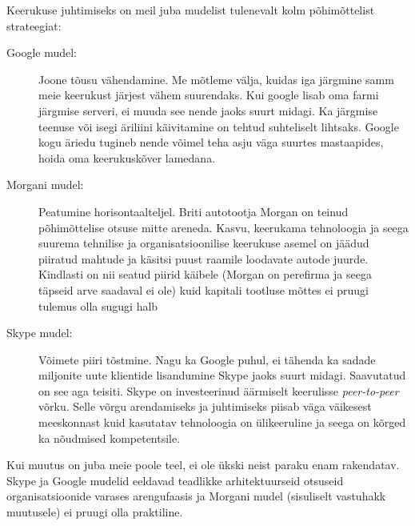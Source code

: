 \documentclass{tufte-book}
\begin{document}
Keerukuse juhtimiseks on meil juba mudelist tulenevalt kolm põhimõttelist strateegiat:
	\begin{description}
		\item[Google mudel:] Joone tõusu vähendamine. Me mõtleme välja, kuidas iga järgmine samm meie keerukust järjest vähem suurendaks. Kui google lisab oma farmi järgmise serveri, ei muuda see nende jaoks suurt midagi. Ka järgmise teenuse või isegi äriliini käivitamine on tehtud suhteliselt lihtsaks. Google kogu äriedu tugineb nende võimel teha asju väga suurtes mastaapides, hoida oma keerukuskõver lamedana.
		\item[Morgani mudel:] Peatumine horisontaalteljel. Briti autotootja Morgan on teinud põhimõttelise otsuse mitte areneda. Kasvu, keerukama tehnoloogia ja seega suurema tehnilise ja organisatsioonilise keerukuse asemel on jäädud piiratud mahtude ja käsitsi puust raamile loodavate autode juurde. Kindlasti on nii seatud piirid käibele (Morgan on perefirma ja seega täpseid arve saadaval ei ole) kuid kapitali tootluse mõttes ei pruugi tulemus olla sugugi halb
		\item[Skype mudel:] Võimete piiri tõstmine. Nagu ka Google puhul, ei tähenda ka sadade miljonite uute klientide lisandumine Skype jaoks suurt midagi. Saavutatud on see aga teisiti. Skype on investeerinud äärmiselt keerulisse \emph{peer-to-peer} võrku. Selle võrgu arendamiseks ja juhtimiseks piisab väga väikesest meeskonnast kuid kasutatav tehnoloogia on ülikeeruline ja seega on kõrged ka nõudmised kompetentsile.
	\end{description}

Kui muutus on juba meie poole teel, ei ole ükski neist paraku enam rakendatav. Skype ja Google mudelid eeldavad teadlikke arhitektuurseid otsuseid organisatsioonide varases arengufaasis ja Morgani mudel (sisuliselt vastuhakk muutusele) ei pruugi olla praktiline. 
\end{document}
